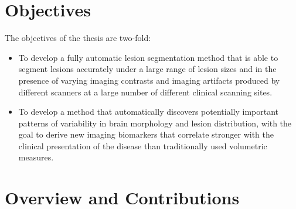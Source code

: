 % 

\section{Objectives}

The objectives of the thesis are two-fold:
\begin{itemize}
\item To develop a fully automatic lesion segmentation method that is able
to segment lesions accurately under a large range of lesion sizes and in the
presence of varying imaging contrasts and imaging artifacts produced by
different scanners at a large number of different clinical scanning sites.

\item To develop a method that automatically discovers potentially important
patterns of variability in brain morphology and lesion distribution, with the
goal to derive new imaging biomarkers that correlate stronger with the
clinical presentation of the disease than traditionally used volumetric
measures.
\end{itemize}

\section{Overview and Contributions}

